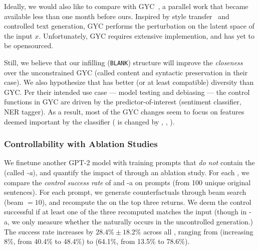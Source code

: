 Ideally, we would also like to compare \sysname with GYC~\citet{madaan2020generate}, a parallel work that became available less than one month before ours.
Inspired by style transfer~\cite{yang2018unsupervised} and controlled text generation, GYC performs the perturbation on the latent space of the input $x$.
Unfortunately, GYC requires extensive implemention, and has yet to be opensourced.

Still, we believe that our infilling (\texttt{BLANK}) structure will improve the \emph{closeness} over the unconstrained GYC (called content and syntactic preservation in their case).
We also hypothesize that \sysname has better (or at least compatible) diversity than GYC. 
Per their intended use case --- model testing and debiasing --- the control functions in GYC are driven by the predictor-of-interest (\eg sentiment classifier, NER tagger). 
As a result, most of the GYC changes seem to focus on features deemed important by the classifier (\eg {} is changed by , , ).




\subsubsection{Controllability with Ablation Studies}
\label{appendix:ablation_control}

We finetune another GPT-2 model with training prompts that \emph{do not} contain the \tagstrshorts (called \emph{\sysname-a}), and quantify the impact of \tagstrs through an ablation study.
For each \tagstr, we compare the \emph{control success rate} of \sysname and \sysname-a on  prompts (from 100 unique original sentences).
For each prompt, we generate counterfactuals through beam search (beam $=10$), and recompute the \tagstrshorts on the top three returns.
We deem the control successful if at least one of the three recomputed \tagstrshort matches the input (though in \sysname-a, we only measure whether the \tagstrshort naturally occurs in the uncontrolled generation.)
The success rate increases by $28.4\% \pm 18.2\%$ across all \tagstrs, ranging from  (increasing 8\%, from 40.4\% to 48.4\%) to  (64.1\%, from 13.5\% to 78.6\%).

